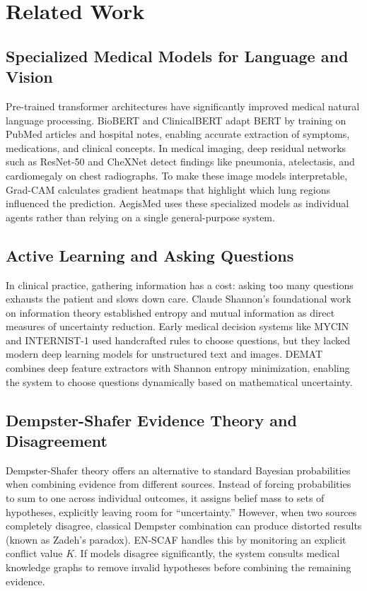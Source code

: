 \documentclass[10pt,twocolumn]{article}
\begin{document}
\section{Related Work}

\subsection{Specialized Medical Models for Language and Vision}
Pre-trained transformer architectures have significantly improved medical natural language processing. BioBERT \cite{lee2020biobert} and ClinicalBERT adapt BERT \cite{devlin2019bert} by training on PubMed articles and hospital notes, enabling accurate extraction of symptoms, medications, and clinical concepts. In medical imaging, deep residual networks such as ResNet-50 \cite{he2016deep} and CheXNet \cite{rajpurkar2017chexnet} detect findings like pneumonia, atelectasis, and cardiomegaly on chest radiographs. To make these image models interpretable, Grad-CAM \cite{selvaraju2017grad} calculates gradient heatmaps that highlight which lung regions influenced the prediction. AegisMed uses these specialized models as individual agents rather than relying on a single general-purpose system.

\subsection{Active Learning and Asking Questions}
In clinical practice, gathering information has a cost: asking too many questions exhausts the patient and slows down care. Claude Shannon's foundational work on information theory \cite{shannon1948mathematical} established entropy and mutual information as direct measures of uncertainty reduction. Early medical decision systems like MYCIN and INTERNIST-1 used handcrafted rules to choose questions, but they lacked modern deep learning models for unstructured text and images. DEMAT combines deep feature extractors with Shannon entropy minimization, enabling the system to choose questions dynamically based on mathematical uncertainty.

\subsection{Dempster-Shafer Evidence Theory and Disagreement}
Dempster-Shafer theory \cite{dempster1967upper, shafer1976mathematical} offers an alternative to standard Bayesian probabilities when combining evidence from different sources. Instead of forcing probabilities to sum to one across individual outcomes, it assigns belief mass to sets of hypotheses, explicitly leaving room for ``uncertainty.'' However, when two sources completely disagree, classical Dempster combination can produce distorted results (known as Zadeh's paradox). EN-SCAF handles this by monitoring an explicit conflict value $K$. If models disagree significantly, the system consults medical knowledge graphs to remove invalid hypotheses before combining the remaining evidence.
\end{document}

